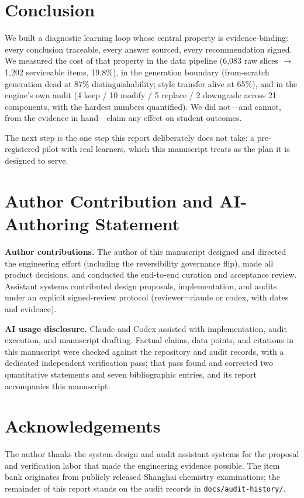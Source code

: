 \section{Conclusion}

We built a diagnostic learning loop whose central property is evidence-binding: every conclusion traceable, every answer sourced, every recommendation signed. We measured the cost of that property in the data pipeline (6,083 raw slices $\rightarrow$ 1,202 serviceable items, 19.8\%), in the generation boundary (from-scratch generation dead at 87\% distinguishability; style transfer alive at 65\%), and in the engine's own audit (4 keep / 10 modify / 5 replace / 2 downgrade across 21 components, with the hardest numbers quantified). We did not---and cannot, from the evidence in hand---claim any effect on student outcomes.

The next step is the one step this report deliberately does not take: a pre-registered pilot with real learners, which this manuscript treats as the plan it is designed to serve.

\section*{Author Contribution and AI-Authoring Statement}

\textbf{Author contributions.} The author of this manuscript designed and directed the engineering effort (including the reversibility governance flip), made all product decisions, and conducted the end-to-end curation and acceptance review. Assistant systems contributed design proposals, implementation, and audits under an explicit signed-review protocol (reviewer=claude or codex, with dates and evidence).

\textbf{AI usage disclosure.} Claude and Codex assisted with implementation, audit execution, and manuscript drafting. Factual claims, data points, and citations in this manuscript were checked against the repository and audit records, with a dedicated independent verification pass; that pass found and corrected two quantitative statements and seven bibliographic entries, and its report accompanies this manuscript.

\section*{Acknowledgements}
The author thanks the system-design and audit assistant systems for the proposal and verification labor that made the engineering evidence possible. The item bank originates from publicly released Shanghai chemistry examinations; the remainder of this report stands on the audit records in \texttt{docs/audit-history/}.

